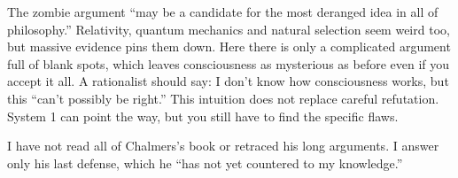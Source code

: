The zombie argument ``may be a candidate for the most deranged idea in all of philosophy.'' Relativity, quantum mechanics and natural selection seem weird too, but massive evidence pins them down. Here there is only a complicated argument full of blank spots, which leaves consciousness as mysterious as before even if you accept it all. A rationalist should say: I don't know how consciousness works, but this ``can't possibly be right.'' This intuition does not replace careful refutation. System 1 can point the way, but you still have to find the specific flaws.

I have not read all of Chalmers's book or retraced his long arguments. I answer only his last defense, which he ``has not yet countered to my knowledge.'' 
